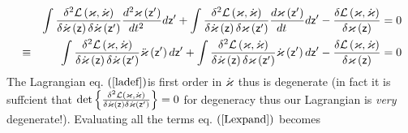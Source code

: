 \begin{eqnarray}
&&\int \frac{\delta ^{2}{\cal L}\left( {\cal \varkappa },{\cal \dot{\varkappa%
}}\right) }{\delta {\cal \dot{\varkappa}}\left( {\sf z}\right) \delta {\cal 
\dot{\varkappa}}\left( {\sf z}^{\prime }\right) }\frac{d^{2}{\cal \varkappa }%
\left( {\sf z}^{\prime }\right) }{dt^{2}\quad }d{\sf z}^{\prime }+\int \frac{%
\delta ^{2}{\cal L}\left( {\cal \varkappa },{\cal \dot{\varkappa}}\right) }{%
\delta {\cal \dot{\varkappa}}\left( {\sf z}\right) \delta {\cal \varkappa }%
\left( {\sf z}^{\prime }\right) }\frac{d{\cal \varkappa }\left( {\sf z}%
^{\prime }\right) }{dt\quad }d{\sf z}^{\prime }-\frac{\delta {\cal L}\left( 
{\cal \varkappa },{\cal \dot{\varkappa}}\right) }{\delta {\cal \varkappa }%
\left( {\sf z}\right) }=0  \nonumber \\
&\equiv &\int \frac{\delta ^{2}{\cal L}\left( {\cal \varkappa },{\cal \dot{%
\varkappa}}\right) }{\delta {\cal \dot{\varkappa}}\left( {\sf z}\right)
\delta {\cal \dot{\varkappa}}\left( {\sf z}^{\prime }\right) }{\cal \ddot{%
\varkappa}}\left( {\sf z}^{\prime }\right) d{\sf z}^{\prime }+\int \frac{%
\delta ^{2}{\cal L}\left( {\cal \varkappa },{\cal \dot{\varkappa}}\right) }{%
\delta {\cal \dot{\varkappa}}\left( {\sf z}\right) \delta {\cal \varkappa }%
\left( {\sf z}^{\prime }\right) }{\cal \dot{\varkappa}}\left( {\sf z}%
^{\prime }\right) d{\sf z}^{\prime }-\frac{\delta {\cal L}\left( {\cal %
\varkappa },{\cal \dot{\varkappa}}\right) }{\delta {\cal \varkappa }\left( 
{\sf z}\right) }=0  \label{Lexpand}
\end{eqnarray}%
The Lagrangian eq. $\left( \ref{ladef}\right) $is first order in ${\cal \dot{%
\varkappa}}$ thus is degenerate (in fact it is suffcient that $\det \left\{ 
\frac{\delta ^{2}{\cal L}\left( {\cal \varkappa },{\cal \dot{\varkappa}}%
\right) }{\delta {\cal \dot{\varkappa}}\left( {\sf z}\right) \delta {\cal 
\dot{\varkappa}}\left( {\sf z}^{\prime }\right) }\right\} =0$ for degeneracy
thus our Lagrangian is {\em very }degenerate!). Evaluating all the terms eq. 
$\left( \ref{Lexpand}\right) $ becomes 
